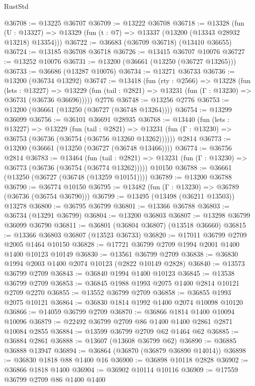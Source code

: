 \begin{lexlean}{RustStd}
\begin{coremodule}
@36708 := @13225 @36707
@36709 := @13222 @36708
@36718 := @13328
    (fun (U : @13327) => @13329 (fun (t : @7) => @13337 (@13200 (@13343 @28932 @13218) @13354)))
@36722 := @36683 (@36709 @36718) (@13410 @36655)
@36724 := @13185 @36708 @36718
@36726 := @13415 @36707 @10076
@36727 := @13252 @10076
@36731 := @13200 (@36661 (@13250 (@36727 @13265)))
@36733 := @36686 (@13287 @10076)
@36734 := @13271 @36733
@36736 := @13200 (@36734 @13292)
@36747 := @13418
    (fun (rty : @2566) =>
    @13228
      (fun (lets : @13227) =>
      @13229 (fun (tail : @2821) => @13231 (fun (Γ : @13230) => @36731 (@36736 @36696)))))
    @2776
@36748 := @13256 @2776
@36753 := @13200 (@36661 (@13250 (@36727 (@36748 @13264))))
@36754 := @13299 @36099
@36756 := @36101 @36691 @28935
@36768 := @13440
    (fun (lets : @13227) =>
    @13229
      (fun (tail : @2821) =>
      @13231 (fun (Γ : @13230) => @36753 (@36736 (@36754 (@36756 @13260 @13262))))))
    @2814
@36773 := @13200 (@36661 (@13250 (@36727 (@36748 @13466))))
@36774 := @36756 @2814
@36783 := @13464
    (fun (tail : @2821) => @13231 (fun (Γ : @13230) => @36773 (@36736 (@36754 (@36774 @13262)))))
    @10150
@36788 := @36661 (@13250 (@36727 (@36748 (@13259 @10151))))
@36789 := @13200 @36788
@36790 := @36774 @10150
@36795 := @13482 (fun (Γ : @13230) => @36789 (@36736 (@36754 @36790)))
@36799 := @13495 (@13498 (@36211 @13503)) @13278
@36800 := @36795 @36799
@36801 := @13366 @36788
@36803 := @36734 (@13291 @36799)
@36804 := @13200 @36803
@36807 := @13298 @36799 @36099 @36790
@36811 := @36801 (@36804 @36807) (@13518 @36660)
@36815 := @13366 @36803 @36807 (@13523 @36733)
@36820 := @17011 @36799 @2709 @2005 @1464 @10150
@36828 := @17721 @36799 @2709 @1994 @2001 @1400 @1400 @10123 @10149
@36830 := @13561 @36799 @2709
@36838 := @36830 @1994 @2003 @1400 @2074 @10123 (@2822 @10149 @2828)
@36840 := @13573 @36799 @2709
@36843 := @36840 @1994 @1400 @10123
@36845 := @13538 @36799 @2709
@36853 := @36845 @1988 @1993 @2075 @1400 @2814 @10121 @2709 @2270
@36855 := @13552 @36799 @2709
@36858 := @36855 @1993 @2075 @10121
@36864 := @36830 @1814 @1992 @1400 @2074 @10098 @10120
@36866 := @14059 @36799 @2709
@36870 := @36866 @1814 @1400 @10094 @10096
@36879 := @22492 @36799 @2709 @86 @1400 @1400 @2861 @2871 @10084 @2855
@36884 := @13599 @36799 @2709 @62 @1464 @62
@36885 := @36884 @2861
@36888 := @13607 (@13608 @36799 @62)
@36890 := @36885 @36888 @13947
@36894 := @36864 (@36870 (@36879 @36890 @14014))
@36898 := @36830 @1818 @88 @1400 @16
@36900 := @36898 @10118 @2828
@36902 := @36866 @1818 @1400
@36904 := @36902 @10114 @10116
@36909 := @17559 @36799 @2709 @86 @1400 @1400

\end{coremodule}
\end{lexlean}
